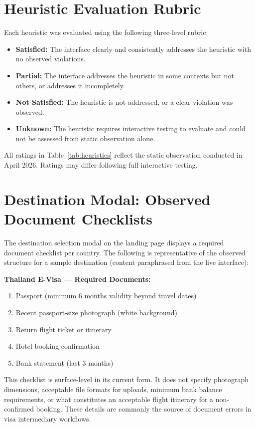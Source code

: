 \documentclass[journal, 10pt, twoside]{IEEEtran}
\begin{document}
\appendices

\section{Heuristic Evaluation Rubric}
\label{app:heuristic}
Each heuristic was evaluated using the following three-level rubric:
\begin{itemize}
  \item \textbf{Satisfied:} The interface clearly and consistently
  addresses the heuristic with no observed violations.
  \item \textbf{Partial:} The interface addresses the heuristic in
  some contexts but not others, or addresses it incompletely.
  \item \textbf{Not Satisfied:} The heuristic is not addressed, or
  a clear violation was observed.
  \item \textbf{Unknown:} The heuristic requires interactive testing
  to evaluate and could not be assessed from static observation alone.
\end{itemize}
All ratings in Table~\ref{tab:heuristics} reflect the static
observation conducted in April 2026. Ratings may differ following
full interactive testing.

\section{Destination Modal: Observed Document Checklists}
\label{app:checklists}
The destination selection modal on the landing page displays a required
document checklist per country. The following is representative of the
observed structure for a sample destination (content paraphrased from
the live interface):

\textbf{Thailand E-Visa --- Required Documents:}
\begin{enumerate}
  \item Passport (minimum 6 months validity beyond travel dates)
  \item Recent passport-size photograph (white background)
  \item Return flight ticket or itinerary
  \item Hotel booking confirmation
  \item Bank statement (last 3 months)
\end{enumerate}

This checklist is surface-level in its current form. It does not specify
photograph dimensions, acceptable file formats for uploads, minimum bank
balance requirements, or what constitutes an acceptable flight itinerary
for a non-confirmed booking. These details are commonly the source of
document errors in visa intermediary workflows.
\end{document}
